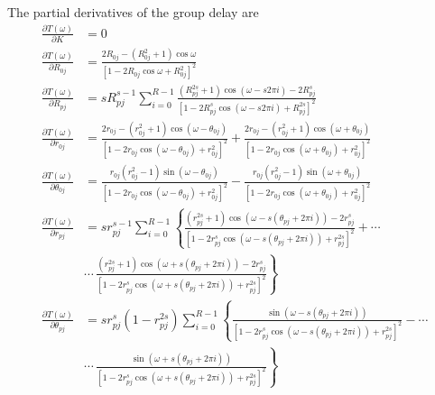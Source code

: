 \documentclass[a4paper,twoside,10pt,english]{report}
\begin{document}
\begin{raggedbottom}
The partial derivatives of the group delay are
\begin{align*}
\frac{\partial T\left(\omega\right)}{\partial K} &= 0\\
\frac{\partial T\left(\omega\right)}{\partial R_{0j}} &= \frac{2R_{0j}-\left(R_{0j}^{2}+1\right)\cos\omega}{\left[1-2R_{0j}\cos\omega+R_{0j}^{2}\right]^{2}}\\
\frac{\partial T\left(\omega\right)}{\partial R_{pj}} &= sR_{pj}^{s-1}\sum_{i=0}^{R-1}\frac{\left(R_{pj}^{2s}+1\right)\cos\left(\omega-s2\pi i\right)-2R_{pj}^{s}}{\left[1-2R_{pj}^{s}\cos\left(\omega-s2\pi i\right)+R_{pj}^{2s}\right]^{2}}\\
\frac{\partial T\left(\omega\right)}{\partial r_{0j}} &= \frac{2r_{0j}-\left(r_{0j}^{2}+1\right)\cos\left(\omega-\theta_{0j}\right)}{\left[1-2r_{0j}\cos\left(\omega-\theta_{0j}\right)+r_{0j}^{2}\right]^{2}}+\frac{2r_{0j}-\left(r_{0j}^{2}+1\right)\cos\left(\omega+\theta_{0j}\right)}{\left[1-2r_{0j}\cos\left(\omega+\theta_{0j}\right)+r_{0j}^{2}\right]^{2}}\\
\frac{\partial T\left(\omega\right)}{\partial\theta_{0j}} &= \frac{r_{0j}(r_{0j}^{2}-1)\sin\left(\omega-\theta_{0j}\right)}{\left[1-2r_{0j}\cos\left(\omega-\theta_{0j}\right)+r_{0j}^{2}\right]^{2}}-\frac{r_{0j}(r_{0j}^{2}-1)\sin\left(\omega+\theta_{0j}\right)}{\left[1-2r_{0j}\cos\left(\omega+\theta_{0j}\right)+r_{0j}^{2}\right]^{2}}\\
\frac{\partial T\left(\omega\right)}{\partial r_{pj}} &= sr_{pj}^{s-1}\sum_{i=0}^{R-1}\left\{ \frac{\left(r_{pj}^{2s}+1\right)\cos\left(\omega-s\left(\theta_{pj}+2\pi i\right)\right)-2r_{pj}^{s}}{\left[1-2r_{pj}^{s}\cos\left(\omega-s\left(\theta_{pj}+2\pi i\right)\right)+r_{pj}^{2s}\right]^{2}}+\cdots\right.\\
 & \left.\cdots\,\frac{\left(r_{pj}^{2s}+1\right)\cos\left(\omega+s\left(\theta_{pj}+2\pi i\right)\right)-2r_{pj}^{s}}{\left[1-2r_{pj}^{s}\cos\left(\omega+s\left(\theta_{pj}+2\pi i\right)\right)+r_{pj}^{2s}\right]^{2}}\right\} \\
\frac{\partial T\left(\omega\right)}{\partial\theta_{pj}} &= sr_{pj}^{s}\left(1-r_{pj}^{2s}\right)\sum_{i=0}^{R-1}\left\{ \frac{\sin\left(\omega-s\left(\theta_{pj}+2\pi i\right)\right)}{\left[1-2r_{pj}^{s}\cos\left(\omega-s\left(\theta_{pj}+2\pi i\right)\right)+r_{pj}^{2s}\right]^{2}}-\cdots\right.\\
 & \left.\cdots\,\frac{\sin\left(\omega+s\left(\theta_{pj}+2\pi i\right)\right)}{\left[1-2r_{pj}^{s}\cos\left(\omega+s\left(\theta_{pj}+2\pi i\right)\right)+r_{pj}^{2s}\right]^{2}}\right\} 

\end{align*}
\end{raggedbottom}
\end{document}
